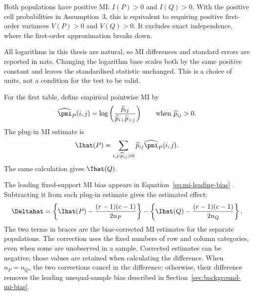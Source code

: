 \begin{assumption}[Positive MI]
Both populations have positive MI: \(I(P)>0\) and \(I(Q)>0\). With the positive
cell probabilities in Assumption~3, this is equivalent to requiring positive
first-order variances \(V(P)>0\) and \(V(Q)>0\). It excludes exact
independence, where the first-order approximation breaks down.
\end{assumption}

\begin{assumption}
All logarithms in this thesis are natural, so MI differences and standard
errors are reported in nats. Changing the logarithm base scales both by the
same positive constant and leaves the standardised statistic unchanged.
This is a choice of units, not a condition for the test to be valid.
\end{assumption}

\medskip
{}

For the first table, define empirical pointwise MI by
\begin{equation}
  \widehat\pmi_P(i,j)
  =\log\left(
  \frac{\widehat p_{ij}}
       {\widehat p_{i+}\widehat p_{+j}}
  \right)
  \qquad\text{when }\widehat p_{ij}>0.
  \label{eq:empirical-pmi}
\end{equation}
The plug-in MI estimate is
\begin{equation}
  \Ihat(P)
  =\sum_{i,j:\widehat p_{ij}>0}
  \widehat p_{ij}\widehat\pmi_P(i,j).
  \label{eq:plugin-mi}
\end{equation}
The same calculation gives \(\Ihat(Q)\).

The leading fixed-support MI bias appears in
Equation~\eqref{eq:mi-leading-bias} \citep{moddemeijer1989}. Subtracting it
from each plug-in estimate gives the estimated effect:
\begin{equation}
  \Deltahat
  =\left\{\Ihat(P)-\frac{(r-1)(c-1)}{2n_P}\right\}
  -\left\{\Ihat(Q)-\frac{(r-1)(c-1)}{2n_Q}\right\}.
  \label{eq:bias-corrected-difference}
\end{equation}
The two terms in braces are the bias-corrected MI estimates for the separate
populations.
The correction uses the fixed numbers of row and column categories, even
when some are unobserved in a sample. Corrected estimates can be negative;
those values are retained when calculating the difference.
When \(n_P=n_Q\), the two corrections cancel in the difference;
otherwise, their difference removes the leading unequal-sample bias described
in Section~\ref{sec:background-mi-bias}.

